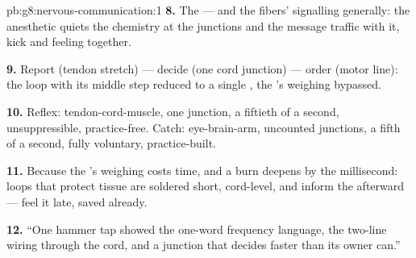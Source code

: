 \begin{solution}{pb:g8:nervous-communication:1}
\textbf{8.} The  --- and the fibers' signalling
generally: the anesthetic quiets the chemistry at the
junctions and the message traffic with it, kick and
feeling together.

\textbf{9.} Report (tendon stretch) --- decide (one
cord junction) --- order (motor line): the loop with its
middle step reduced to a single , the 's
weighing bypassed.

\textbf{10.} Reflex: tendon-cord-muscle, one junction, a
fiftieth of a second, unsuppressible, practice-free.
Catch: eye-brain-arm, uncounted junctions, a fifth of a
second, fully voluntary, practice-built.

\textbf{11.} Because the 's weighing costs time, and
a burn deepens by the millisecond: loops that protect
tissue are soldered short, cord-level, and inform the
 afterward --- feel it late, saved already.

\textbf{12.} ``One hammer tap showed the one-word
frequency language, the two-line wiring through the cord,
and a junction that decides faster than its owner can.''
\end{solution}
